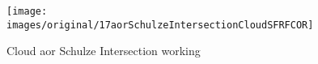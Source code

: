 \begin{figure}[!htb] 
\centering 
\texttt{[image: images/original/17aorSchulzeIntersectionCloudSFRFCOR]} 
\caption{Cloud aor Schulze Intersection working}
\label{fig:17aorSchulzeIntersectionCloudSFRFCOR} 
\end{figure}


